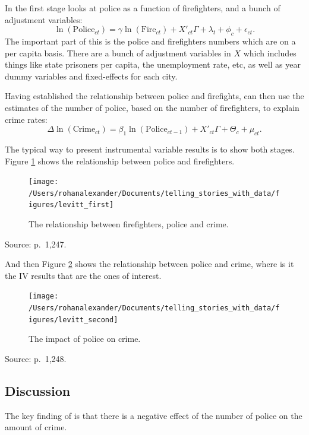 \documentclass[
]{book}
\begin{document}
In the first stage \citet{levitt2002using} looks at police as a function of firefighters, and a bunch of adjustment variables:
\[\ln(\mbox{Police}_{ct}) = \gamma \ln(\mbox{Fire}_{ct}) + X'_{ct}\Gamma + \lambda_t + \phi_c + \epsilon_{ct}.\]
The important part of this is the police and firefighters numbers which are on a per capita basis. There are a bunch of adjustment variables in \(X\) which includes things like state prisoners per capita, the unemployment rate, etc, as well as year dummy variables and fixed-effects for each city.

Having established the relationship between police and firefights, \citet{levitt2002using} can then use the estimates of the number of police, based on the number of firefighters, to explain crime rates:
\[\Delta\ln(\mbox{Crime}_{ct}) = \beta_1 \ln(\mbox{Police}_{ct-1}) + X'_{ct}\Gamma + \Theta_c + \mu_{ct}.\]

The typical way to present instrumental variable results is to show both stages. Figure \ref{fig:levittcrimefirst} shows the relationship between police and firefighters.

\begin{figure}
\texttt{[image: /Users/rohanalexander/Documents/telling\_stories\_with\_data/figures/levitt\_first]} \caption{The relationship between firefighters, police and crime.}\label{fig:levittcrimefirst}
\end{figure}

Source: \citet{levitt2002using} p.~1,247.

And then Figure \ref{fig:levittcrimesecond} shows the relationship between police and crime, where is it the IV results that are the ones of interest.

\begin{figure}
\texttt{[image: /Users/rohanalexander/Documents/telling\_stories\_with\_data/figures/levitt\_second]} \caption{The impact of police on crime.}\label{fig:levittcrimesecond}
\end{figure}

Source: \citet{levitt2002using} p.~1,248.

\hypertarget{discussion}{%
\subsection{Discussion}\label{discussion}}

The key finding of \citet{levitt2002using} is that there is a negative effect of the number of police on the amount of crime.
\end{document}
